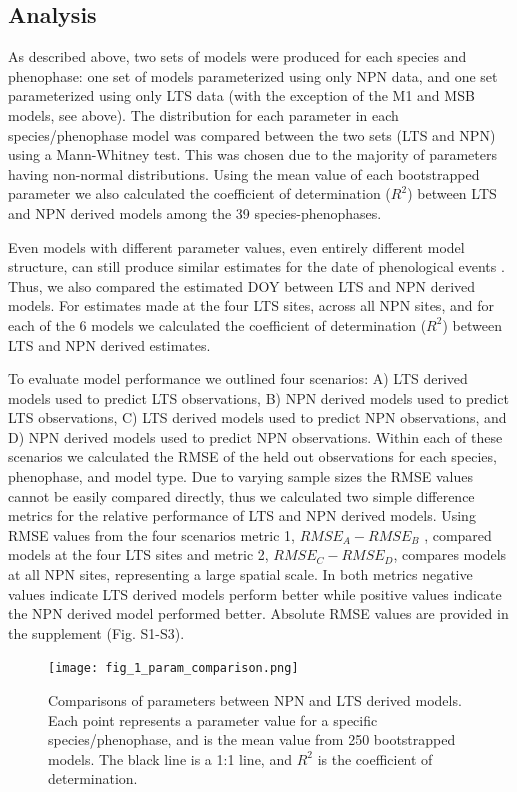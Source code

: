 \documentclass[fleqn,10pt,lineno]{wlpeerj} %
\begin{document}
\subsection*{Analysis}

As described above, two sets of models were produced for each species and phenophase: one set of models parameterized using only NPN data, and one set parameterized using only LTS data (with the exception of the M1 and MSB models, see above). The distribution for each parameter in each species/phenophase model was compared between the two sets (LTS and NPN) using a Mann-Whitney test. This was chosen due to the majority of parameters having non-normal distributions. Using the mean value of each bootstrapped parameter we also calculated the coefficient of determination ($R^2$) between LTS and NPN derived models among the 39 species-phenophases. 

Even models with different parameter values, even entirely different model structure, can still produce similar estimates for the date of phenological events \citep{basler2016}. Thus, we also compared the estimated DOY between LTS and NPN derived models. For estimates made at the four LTS sites, across all NPN sites, and for each of the 6 models we calculated the coefficient of determination ($R^2$) between LTS and NPN derived estimates.   

To evaluate model performance we outlined four scenarios: A) LTS derived models used to predict LTS observations, B) NPN derived models used to predict LTS observations, C) LTS derived models used to predict NPN observations, and D) NPN derived models used to predict NPN observations. Within each of these scenarios we calculated the RMSE of the held out observations for each species, phenophase, and  model type. Due to varying sample sizes the RMSE values cannot be easily compared directly, thus we calculated two simple difference metrics for the relative performance of LTS and NPN derived models. Using RMSE values from the four scenarios metric 1, $RMSE_{A} - RMSE_{B}$ , compared models at the four LTS sites and metric 2, $RMSE_{C} - RMSE_{D}$, compares models at all NPN sites, representing a large spatial scale. In both metrics negative values indicate LTS derived models perform better while positive values indicate the NPN derived model performed better. Absolute RMSE values are provided in the supplement (Fig. S1-S3).


\begin{figure}[]
	\centering
		\texttt{[image: fig\_1\_param\_comparison.png]}
	\caption{Comparisons of parameters between NPN and LTS derived models. Each point represents a parameter value for a specific species/phenophase, and is the mean value from 250 bootstrapped  models. The black line is a 1:1 line, and $R^2$ is the coefficient of determination.}
\end{figure}
\end{document}
